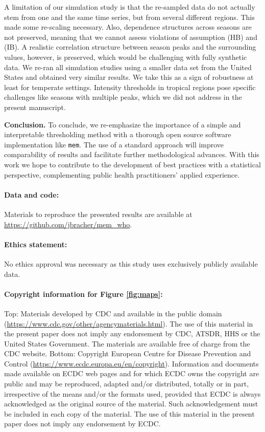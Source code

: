 \documentclass[12pt]{article}
\begin{document}
A limitation of our simulation study is that the re-sampled data do not actually stem from one and the same time series, but from several different regions. This made some re-scaling necessary. Also, dependence structures across seasons are not preserved, meaning that we cannot assess violations of assumption (HB) and (IB). A realistic correlation structure between season peaks and the surrounding values, however, is preserved, which would be challenging with fully synthetic data. We re-ran all simulation studies using a smaller data set from the United States and obtained very similar results. We take this as a sign of robustness at least for temperate settings. Intensity thresholds in tropical regions pose specific challenges like seasons with multiple peaks, which we did not address in the present manuscript.

\noindent \textbf{Conclusion.} To conclude, we re-emphasize the importance of a simple and interpretable thresholding method with a thorough open source software implementation like \texttt{mem}. The use of a standard approach will improve comparability of results and facilitate further methodological advances. With this work we hope to contribute to the development of best practices  with a statistical perspective, complementing public health practitioners' applied experience.

\paragraph{Data and code:} Materials to reproduce the presented results are available at \url{https://github.com/jbracher/mem_who}.

\paragraph{Ethics statement:} No ethics approval was necessary as this study uses exclusively publicly available data.

\paragraph{Copyright information for Figure \ref{fig:maps}:}

Top: Materials developed by CDC and available in the public domain (\url{https://www.cdc.gov/other/agencymaterials.html}). The use of this material in the present paper does not imply any endorsement by CDC, ATSDR, HHS or the United States Government. The materials are available free of charge from the CDC website. Bottom: Copyright European Centre for Disease Prevention and Control (\url{https://www.ecdc.europa.eu/en/copyright}). Information and documents made available on ECDC web pages and for which ECDC owns the copyright are public and may be reproduced, adapted and/or distributed, totally or in part, irrespective of the means and/or the formats used, provided that ECDC is always acknowledged as the original source of the material. Such acknowledgement must be included in each copy of the material. The use of this material in the present paper does not imply any endorsement by ECDC.
\end{document}
